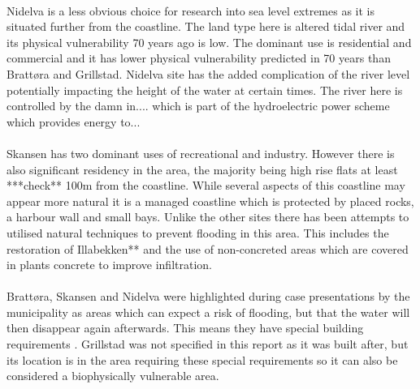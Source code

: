 \paragraph{}
Nidelva is a less obvious choice for research into sea level extremes as it is situated further from the coastline. The land type here is altered tidal river and its physical vulnerability 70 years ago is low. The dominant use is residential and commercial and it has lower physical vulnerability predicted in 70 years than Brattøra and Grillstad. Nidelva site has the added complication of the river level potentially impacting the height of the water at certain times. The river here is controlled by the damn in.... which is part of the hydroelectric power scheme which provides energy to...
\paragraph{}
Skansen has two dominant uses of recreational and industry. However there is also significant residency in the area, the majority being high rise flats at least ***check** 100m from the coastline. While several aspects of this coastline may appear more natural it is a managed coastline which is protected by placed rocks, a harbour wall and small bays. Unlike the other sites there has been attempts to utilised natural techniques to prevent flooding in this area. This includes the restoration of Illabekken** and the use of non-concreted areas which are covered in plants concrete to improve infiltration.
\paragraph{}

\paragraph{}
Brattøra, Skansen and Nidelva were highlighted during case presentations by the municipality as areas which can expect a risk of flooding, but that the water will then disappear again afterwards. This means they have special building requirements \cite{hanssen_saksframlegg_2013}. Grillstad was not specified in this report as it was built after, but its location is in the area requiring these special requirements so it can also be considered a biophysically vulnerable area.  


